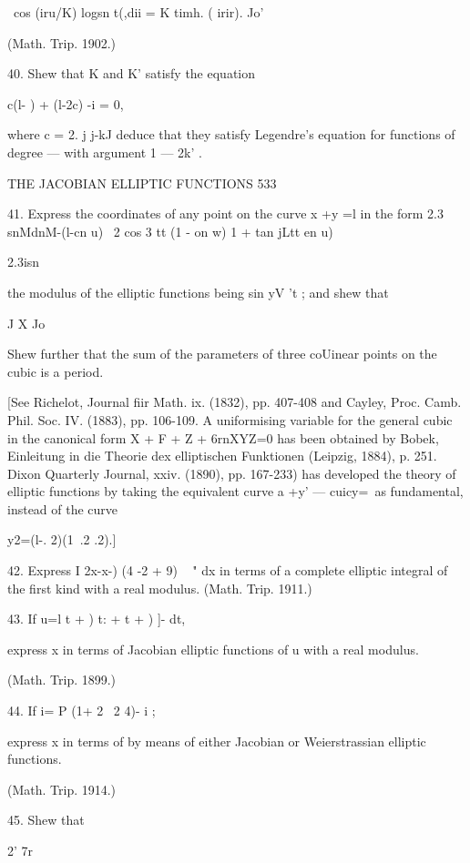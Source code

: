 \ cos (iru/K) logsn t(,dii = K timh. ( irir). Jo'

(Math. Trip. 1902.)

40. Shew that K and K' satisfy the equation

c(l- ) + (l-2c) -i = 0,

where c = 2. j j-kJ deduce that they satisfy Legendre's equation for
functions of degree — with argument 1 — 2k' .



THE JACOBIAN ELLIPTIC FUNCTIONS 533

41. Express the coordinates of any point on the curve x +y =l in the
form 2.3 snMdnM-(l-cn u) \ 2 cos 3 tt (1 - on w) 1 + tan jLtt en u)

2.3isn%

the modulus of the elliptic functions being sin yV 't ; and shew that

J X Jo

Shew further that the sum of the parameters of three coUinear points
on the cubic is a period.

[See Richelot, Journal fiir Math. ix. (1832), pp. 407-408 and Cayley,
Proc. Camb. Phil. Soc. IV. (1883), pp. 106-109. A uniformising
variable for the general cubic in the canonical form X + F + Z +
6rnXYZ=0 has been obtained by Bobek, Einleitung in die Theorie dex
elliptischen Funktionen (Leipzig, 1884), p. 251. Dixon Quarterly
Journal, xxiv. (1890), pp. 167-233) has developed the theory of
elliptic functions by taking the equivalent curve a +y' — cuicy=\ as
fundamental, instead of the curve

y2=(l-. 2)(1\ .2 .2).]

42. Express I 2x-x-) (4 -2 + 9) ~ " dx in terms of a complete elliptic
integral of the first kind with a real modulus. (Math. Trip. 1911.)

43. If u=l t + ) t: + t + ) ]- dt,

express x in terms of Jacobian elliptic functions of u with a real
modulus.

(Math. Trip. 1899.)



44. If i= P (1+ 2 \ 2 4)- i ;



express x in terms of by means of either Jacobian or Weierstrassian
elliptic functions.

(Math. Trip. 1914.)

45. Shew that

2' 7r

